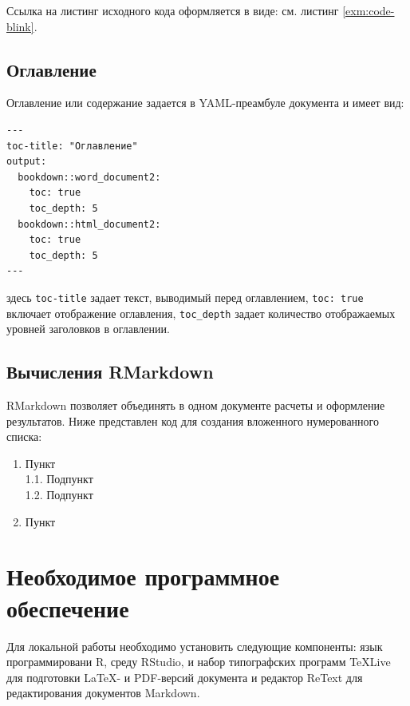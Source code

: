 \documentclass[
  a4paper,
]{book}
\providecommand{\tightlist}{%
  \setlength{\itemsep}{0pt}\setlength{\parskip}{0pt}}
\theoremstyle{definition}
\theoremstyle{definition}
\theoremstyle{definition}
\theoremstyle{definition}
\theoremstyle{remark}
\begin{document}
Ссылка на листинг исходного кода оформляется в виде: см. листинг \ref{exm:code-blink}.

\hypertarget{markdown-toc}{%
\subsection{Оглавление}\label{markdown-toc}}

Оглавление или содержание задается в YAML-преамбуле документа и имеет вид:

\begin{verbatim}
---
toc-title: "Оглавление"
output:
  bookdown::word_document2:
    toc: true
    toc_depth: 5
  bookdown::html_document2:
    toc: true
    toc_depth: 5
---
\end{verbatim}

здесь \texttt{toc-title} задает текст, выводимый перед оглавлением, \texttt{toc:\ true} включает отображение оглавления, \texttt{toc\_depth} задает количество отображаемых уровней заголовков в оглавлении.

\hypertarget{markdown-rmarkdown}{%
\subsection{Вычисления RMarkdown}\label{markdown-rmarkdown}}

RMarkdown позволяет объединять в одном документе расчеты и оформление результатов. Ниже представлен код для создания вложенного нумерованного списка:

\begin{enumerate}
\def\labelenumi{\arabic{enumi}.}
\tightlist
\item
  Пункт\\
  1.1. Подпункт\\
  1.2. Подпункт\\
\item
  Пункт
\end{enumerate}

\hypertarget{software}{%
\section{Необходимое программное обеспечение}\label{software}}

Для локальной работы необходимо установить следующие компоненты: язык программировани R, среду RStudio, и набор типографских программ TeXLive для подготовки LaTeX- и PDF-версий документа и редактор ReText для редактирования документов Markdown.
\end{document}
